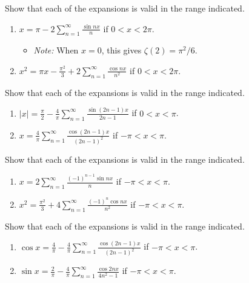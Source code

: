 \begin{problembox}
Show that each of the expansions is valid in the range indicated.
\begin{enumerate}[label=(\alph*)]
\item $x = \pi - 2 \sum_{n=1}^\infty \frac{\sin nx}{n}$ if $0 < x < 2\pi$.
\begin{itemize}
\item \textit{Note:} When $x = 0$, this gives $\zeta(2) = \pi^2/6$.
\end{itemize}
\item $x^2 = \pi x - \frac{\pi^2}{3} + 2 \sum_{n=1}^\infty \frac{\cos nx}{n^2}$ if $0 < x < 2\pi$.
\end{enumerate}
\end{problembox}

\begin{problembox}
Show that each of the expansions is valid in the range indicated.
\begin{enumerate}[label=(\alph*)]
\item $|x| = \frac{\pi}{2} - \frac{4}{\pi} \sum_{n=1}^\infty \frac{\sin (2n - 1)x}{2n - 1}$ if $0 < x < \pi$.
\item $x = \frac{4}{\pi} \sum_{n=1}^\infty \frac{\cos (2n - 1)x}{(2n - 1)^2}$ if $-\pi < x < \pi$.
\end{enumerate}
\end{problembox}

\begin{problembox}
Show that each of the expansions is valid in the range indicated.
\begin{enumerate}[label=(\alph*)]
\item $x = 2 \sum_{n=1}^\infty \frac{(-1)^{n-1} \sin nx}{n}$ if $-\pi < x < \pi$.
\item $x^2 = \frac{\pi^2}{3} + 4 \sum_{n=1}^\infty \frac{(-1)^n \cos nx}{n^2}$ if $-\pi < x < \pi$.
\end{enumerate}
\end{problembox}

\begin{problembox}
Show that each of the expansions is valid in the range indicated.
\begin{enumerate}[label=(\alph*)]
\item $\cos x = \frac{4}{\pi} - \frac{4}{\pi} \sum_{n=1}^\infty \frac{\cos (2n - 1)x}{(2n - 1)^2}$ if $-\pi < x < \pi$.
\item $\sin x = \frac{2}{\pi} - \frac{4}{\pi} \sum_{n=1}^\infty \frac{\cos 2nx}{4n^2 - 1}$ if $-\pi < x < \pi$.
\end{enumerate}
\end{problembox}


